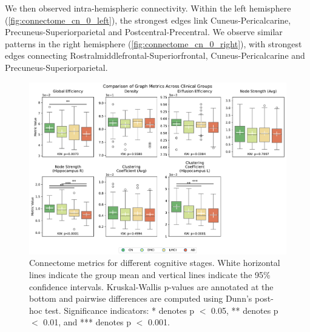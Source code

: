 We then observed intra-hemispheric connectivity. Within the left hemisphere (\autoref{fig:connectome_cn_0_left}), the strongest edges link Cuneus-Pericalcarine, Precuneus-Superiorparietal and Postcentral-Precentral. We observe similar patterns in the right hemisphere (\autoref{fig:connectome_cn_0_right}), with strongest edges connecting Rostralmiddlefrontal-Superiorfrontal, Cuneus-Pericalcarine and Precuneus-Superiorparietal.

    
\begin{figure}[b]
    \centering
    \begin{tcolorbox}[colback=white, colframe=black, boxrule=0.5pt, arc=0pt]
        \includegraphics[width=\textwidth]{figures/graph_metrics_comparison.pdf}
        \caption{Connectome metrics for different cognitive stages. White horizontal lines indicate the group mean and vertical lines indicate the 95\% confidence intervals. Kruskal-Wallis p-values are annotated at the bottom and pairwise differences are computed using Dunn's post-hoc test. Significance indicators: * denotes p $<$ 0.05, ** denotes p $<$ 0.01, and *** denotes p $<$ 0.001.}
    
    
    \label{fig:graph_metrics_comparison}
    

\end{tcolorbox}
\end{figure}
